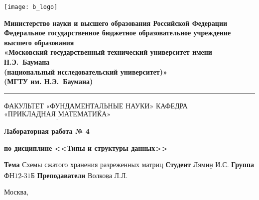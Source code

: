 \thispagestyle{empty}

\noindent \begin{minipage}{0.15\textwidth}
	\texttt{[image: b\_logo]}
\end{minipage}
\noindent\begin{minipage}{0.85\textwidth}\centering
	\textbf{Министерство науки и высшего образования Российской Федерации}\\
	\textbf{Федеральное государственное бюджетное образовательное учреждение высшего образования}\\
	\textbf{«Московский государственный технический университет имени Н.Э.~Баумана}\\
	\textbf{(национальный исследовательский университет)»}\\
	\textbf{(МГТУ им. Н.Э.~Баумана)}
\end{minipage}

\noindent\rule{\linewidth}{3pt}
\newline\newline
\noindent ФАКУЛЬТЕТ $\underline{\text{«ФУНДАМЕНТАЛЬНЫЕ НАУКИ»}}$ \newline\newline
\noindent КАФЕДРА $\underline{\text{«ПРИКЛАДНАЯ МАТЕМАТИКА»}}$

\vspace{1cm}

\begin{center}
	\noindent\centering
		\Large\textbf{Лабораторная работа № 4}
	
\end{center}
\begin{center}
	\noindent\centering
		\Large\textbf{по дисциплине <<Типы и структуры данных>>}
\end{center}

\noindent\textbf{Тема} $\underline{\text{Схемы сжатого хранения разреженных матриц}}$\newline\newline
\noindent\textbf{Студент} $\underline{\text{Лямин И.С.}}$\newline\newline
\noindent\textbf{Группа} $\underline{\text{ФН12-31Б}}$\newline\newline
\noindent\textbf{Преподаватели} $\underline{\text{Волкова Л.Л.}}$\newline

\begin{center}
	\vfill
	Москва,~\the\year 
\end{center}
\clearpage

